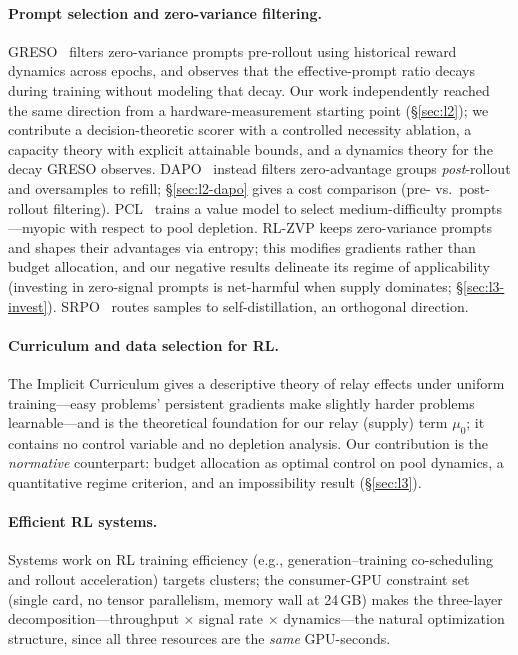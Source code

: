 \documentclass[11pt]{article}
\theoremstyle{definition}
\begin{document}
\paragraph{Prompt selection and zero-variance filtering.}
GRESO~\citep{zheng2025greso} filters zero-variance prompts pre-rollout using
historical reward dynamics across epochs, and observes that the effective-prompt
ratio decays during training without modeling that decay. Our work independently
reached the same direction from a hardware-measurement starting point
(\S\ref{sec:l2}); we contribute a decision-theoretic scorer with a controlled
necessity ablation, a capacity theory with explicit attainable bounds, and a
dynamics theory for the decay GRESO observes.
DAPO~\citep{yu2025dapo} instead filters zero-advantage groups \emph{post}-rollout
and oversamples to refill; \S\ref{sec:l2-dapo} gives a cost comparison (pre- vs.\
post-rollout filtering). PCL~\citep{gao2025pcl} trains a value model to select
medium-difficulty prompts---myopic with respect to pool depletion. RL-ZVP
\citep{le2025rlzvp} keeps zero-variance prompts and shapes their advantages via
entropy; this modifies gradients rather than budget allocation, and our negative
results delineate its regime of applicability (investing in zero-signal prompts is
net-harmful when supply dominates; \S\ref{sec:l3-invest}). SRPO~\citep{li2026srpo}
routes samples to self-distillation, an orthogonal direction.

\paragraph{Curriculum and data selection for RL.} The Implicit Curriculum
\citep{huang2026implicit} gives a descriptive theory of relay effects under uniform
training---easy problems' persistent gradients make slightly harder problems
learnable---and is the theoretical foundation for our relay (supply) term $\mu_0$;
it contains no control variable and no depletion analysis. Our contribution is the
\emph{normative} counterpart: budget allocation as optimal control on pool
dynamics, a quantitative regime criterion, and an impossibility result
(\S\ref{sec:l3}).

\paragraph{Efficient RL systems.} Systems work on RL training efficiency
(e.g., generation--training co-scheduling and rollout acceleration) targets
clusters; the consumer-GPU constraint set (single card, no tensor parallelism,
memory wall at 24\,GB) makes the three-layer decomposition---throughput $\times$
signal rate $\times$ dynamics---the natural optimization structure, since all three
resources are the \emph{same} GPU-seconds.
\end{document}
